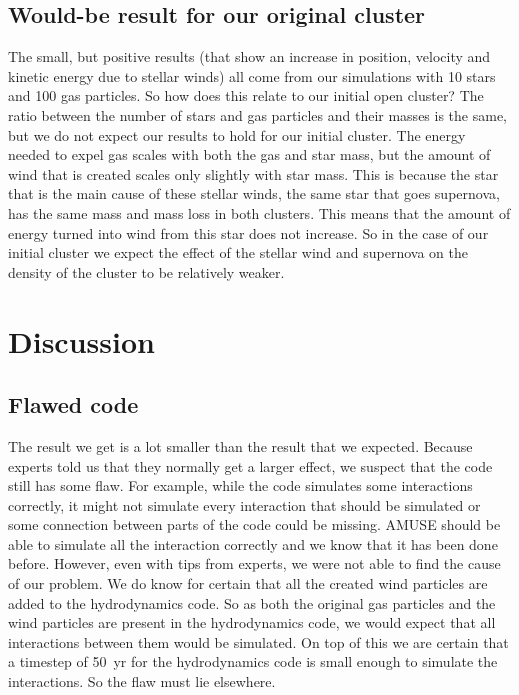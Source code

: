 \documentclass[12pt, twocolumn]{article}
\begin{document}
\subsection{Would-be result for our original cluster}
The small, but positive results (that show an increase in position, velocity and kinetic energy due to stellar winds) all come from our simulations with 10 stars and 100 gas particles.
So how does this relate to our initial open cluster?
The ratio between the number of stars and gas particles and their masses is the same, but we do not expect our results to hold for our initial cluster.
The energy needed to expel gas scales with both the gas and star mass, but the amount of wind that is created scales only slightly with star mass.
This is because the star that is the main cause of these stellar winds, the same star that goes supernova, has the same mass and mass loss in both clusters.
This means that the amount of energy turned into wind from this star does not increase.
So in the case of our initial cluster we expect the effect of the stellar wind and supernova on the density of the cluster to be relatively weaker. 



\section{Discussion}
\subsection{Flawed code}
The result we get is a lot smaller than the result that we expected.
Because experts told us that they normally get a larger effect, we suspect that the code still has some flaw. For example, while the code simulates some interactions correctly, it might not simulate every interaction that should be simulated or some connection between parts of the code could be missing.
AMUSE should be able to simulate all the interaction correctly and we know that it has been done before. However, even with tips from experts, we were not able to find the cause of our problem. We do know for certain that all the created wind particles are added to the hydrodynamics code. So as both the original gas particles and the wind particles are present in the hydrodynamics code, we would expect that all interactions between them would be simulated. 
On top of this we are certain that a timestep of \SI{50}{yr} for the hydrodynamics code is small enough to simulate the interactions. So the flaw must lie elsewhere.
\end{document}
